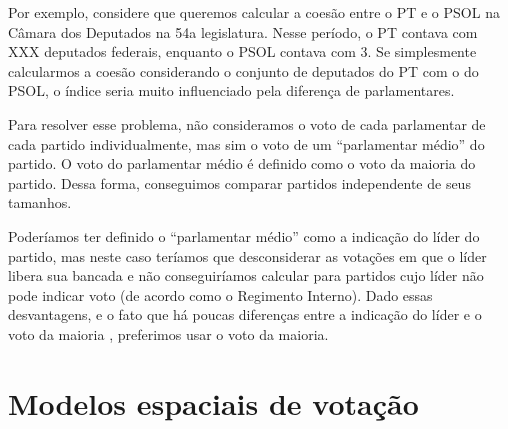 Por exemplo, considere que queremos calcular a coesão entre o \gls{PT} e o \gls{PSOL} na
Câmara dos Deputados na 54a legislatura. Nesse período, o \gls{PT} contava com XXX
deputados federais, enquanto o \gls{PSOL} contava com 3. Se simplesmente calcularmos
a coesão considerando o conjunto de deputados do \gls{PT} com o do \gls{PSOL}, o índice
seria muito influenciado pela diferença de parlamentares.

Para resolver esse problema, não consideramos o voto de cada parlamentar de
cada partido individualmente, mas sim o voto de um ``parlamentar médio'' do
partido. O voto do parlamentar médio é definido como o voto da maioria do
partido. Dessa forma, conseguimos comparar partidos independente de seus
tamanhos.

Poderíamos ter definido o ``parlamentar médio'' como a indicação do líder do
partido, mas neste caso teríamos que desconsiderar as votações em que o líder
libera sua bancada e não conseguiríamos calcular para partidos cujo líder não
pode indicar voto (de acordo como o Regimento Interno). Dado essas
desvantagens, e o fato que há poucas diferenças entre a indicação do líder e o
voto da maioria \cite{Figueiredo1995}, preferimos usar o voto da maioria.

\section{Modelos espaciais de votação}

\begin{knitrout}
\color{fgcolor}\begin{kframe}
\begin{alltt}
 \hlkwb{=} \hlstd{(} \hlstd{=} \hlstd{(}\hlstd{,} \hlstd{,} \hlstd{,} \hlstd{,} \hlstd{),}
                            \hlstd{=} \hlstd{(}\hlstd{,} \hlstd{,} \hlstd{,} \hlstd{,} \hlstd{))}
 \hlkwb{=} \hlstd{(}\hlstd{,} \hlstd{)}
 \hlkwb{=} \hlstd{(}\hlstd{,} \hlstd{)}
 \hlkwb{=} \hlstd{(} \hlstd{=} 
                       \hlstd{=} 
\end{alltt}
\end{kframe}
\end{knitrout}

